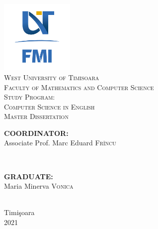 \documentclass[12pt, a4paper]{report}
\begin{document}
	
	
	\begin{titlepage}
		
		\newcommand{\HRule}{\rule{\linewidth}{0.5mm}}
		
		\center
		
		\vspace{-20pt}
		\includegraphics[width=100pt]{../images/FMI-03.png}\\[1.0cm]
		
		\textsc{\LARGE West University of Timisoara}\\[0.5cm]
		\textsc{\Large Faculty of Mathematics and Computer Science}\\[0.5cm]
		\textsc{\large Study Program: \\Computer Science in English}\\[3cm]
		\textsc{\Huge Master Dissertation}\\[5cm]
		
		\begin{minipage}{0.4\textwidth}
			\begin{flushleft} \large
				\textbf{COORDINATOR:}\\
				Associate Prof. Marc Eduard \textsc{Frîncu}
			\end{flushleft}
		\end{minipage}
		~
		\begin{minipage}{0.4\textwidth}
			\begin{flushright} \large
				\textbf{GRADUATE:} \\
				Maria Minerva \textsc{Vonica}
			\end{flushright}
		\end{minipage}\\[0.5cm]
			
		\vfill
		{\large Timi\c{s}oara \\2021}\\
		\vfill
		
	\end{titlepage}
	
	
\end{document}
